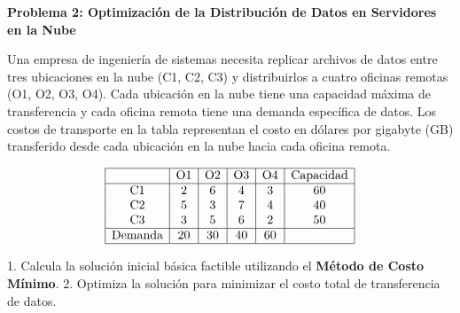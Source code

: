 \documentclass{article}
\begin{document}
\begin{problem}
\textbf{Problema 2: Optimización de la Distribución de Datos en Servidores en la Nube}

Una empresa de ingeniería de sistemas necesita replicar archivos de datos entre tres ubicaciones en la nube (C1, C2, C3) y distribuirlos a cuatro oficinas remotas (O1, O2, O3, O4). Cada ubicación en la nube tiene una capacidad máxima de transferencia y cada oficina remota tiene una demanda específica de datos. Los costos de transporte en la tabla representan el costo en dólares por gigabyte (GB) transferido desde cada ubicación en la nube hacia cada oficina remota.

\[
\begin{array}{|c|c|c|c|c|c|}
\hline
           & \text{O1} & \text{O2} & \text{O3} & \text{O4} & \text{Capacidad} \\
\hline
\text{C1}  & 2         & 6         & 4         & 3         & 60        \\
\text{C2}  & 5         & 3         & 7         & 4         & 40        \\
\text{C3}  & 3         & 5         & 6         & 2         & 50        \\
\hline
\text{Demanda} & 20    & 30        & 40        & 60        &           \\
\hline
\end{array}
\]

1. Calcula la solución inicial básica factible utilizando el \textbf{Método de Costo Mínimo}.
2. Optimiza la solución para minimizar el costo total de transferencia de datos.

\end{problem}

\vspace{-0.5cm}
\end{document}

